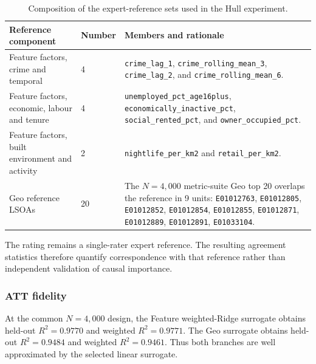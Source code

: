 \begin{table}[H]
\centering
\caption{Composition of the expert-reference sets used in the Hull experiment.}
\label{tab:hull_ground_truth_design}
\small
\begin{tabularx}{\textwidth}{p{} p{} X}
\toprule
Reference component & Number & Members and rationale \\
\midrule
Feature factors, crime and temporal & 4 &
\texttt{crime\_lag\_1}, \texttt{crime\_rolling\_mean\_3}, \texttt{crime\_lag\_2}, and \texttt{crime\_rolling\_mean\_6}. \\
Feature factors, economic, labour and tenure & 4 &
\texttt{unemployed\_pct\_age16plus}, \texttt{economically\_inactive\_pct}, \texttt{social\_rented\_pct}, and \texttt{owner\_occupied\_pct}. \\
Feature factors, built environment and activity & 2 &
\texttt{nightlife\_per\_km2} and \texttt{retail\_per\_km2}. \\
Geo reference LSOAs & 20 &
The $N=4{,}000$ metric-suite Geo top 20 overlaps the reference in 9 units:
\texttt{E01012763},
\texttt{E01012805},
\texttt{E01012852},
\texttt{E01012854},
\texttt{E01012855},
\texttt{E01012871},
\texttt{E01012889},
\texttt{E01012891},
\texttt{E01033104}. \\
\bottomrule
\end{tabularx}
\end{table}

The rating remains a single-rater expert reference. The resulting agreement statistics therefore quantify correspondence with that reference rather than independent validation of causal importance.


\subsubsection{ATT fidelity}
\label{sec:hull_att_fidelity}

At the common $N=4{,}000$ design, the Feature weighted-Ridge surrogate obtains held-out $R^2=0.9770$ and weighted $R^2=0.9771$. The Geo surrogate obtains held-out $R^2=0.9484$ and weighted $R^2=0.9461$. Thus both branches are well approximated by the selected linear surrogate.

\begin{table}[H]
\centering
\caption{ATT fidelity at the final $N=4{,}000$ design (seed 42).}
\label{tab:hull_fidelity_selected}
\small
{}
\end{table}


